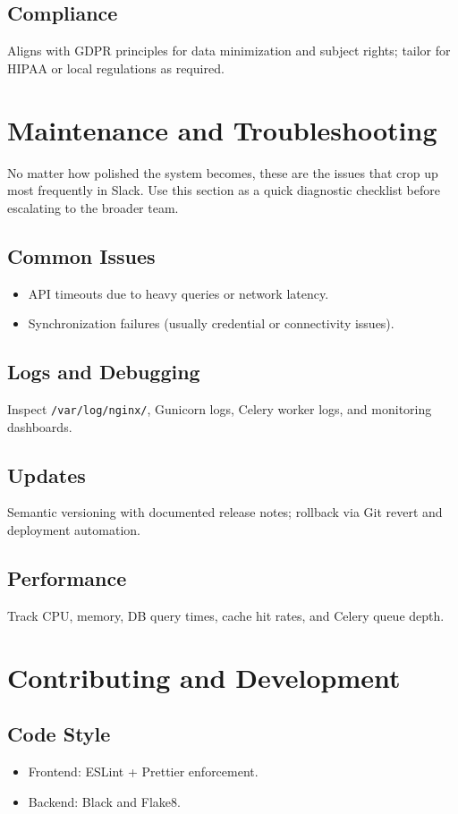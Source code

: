 \documentclass[11pt]{article}
\begin{document}
\subsection{Compliance}
Aligns with GDPR principles for data minimization and subject rights; tailor for HIPAA or local regulations as required.

\section{Maintenance and Troubleshooting}
\noindent No matter how polished the system becomes, these are the issues that crop up most frequently in Slack. Use this section as a quick diagnostic checklist before escalating to the broader team.
\subsection{Common Issues}
\begin{itemize}[leftmargin=*]
  \item API timeouts due to heavy queries or network latency.
  \item Synchronization failures (usually credential or connectivity issues).
\end{itemize}

\subsection{Logs and Debugging}
Inspect \verb|/var/log/nginx/|, Gunicorn logs, Celery worker logs, and monitoring dashboards.

\subsection{Updates}
Semantic versioning with documented release notes; rollback via Git revert and deployment automation.

\subsection{Performance}
Track CPU, memory, DB query times, cache hit rates, and Celery queue depth.

\section{Contributing and Development}
\subsection{Code Style}
\begin{itemize}[leftmargin=*]
  \item Frontend: ESLint + Prettier enforcement.
  \item Backend: Black and Flake8.
\end{itemize}
\end{document}
